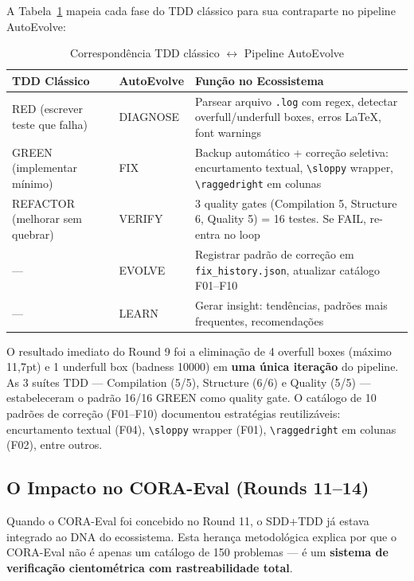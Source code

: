 A Tabela~\ref{tab:tdd_pipeline} mapeia cada fase do TDD clássico para sua
contraparte no pipeline AutoEvolve:

\begin{table}[H]\centering
\caption{Correspondência TDD clássico $\leftrightarrow$ Pipeline AutoEvolve}
\label{tab:tdd_pipeline}
\begin{tabular}{p{}p{}p{}}
\toprule
\textbf{TDD Clássico} & \textbf{AutoEvolve} & \textbf{Função no Ecossistema} \\
\midrule
RED (escrever teste que falha) & DIAGNOSE & Parsear arquivo \texttt{.log} com regex, detectar overfull/underfull boxes, erros LaTeX, font warnings \\
GREEN (implementar mínimo) & FIX & Backup automático + correção seletiva: encurtamento textual, \texttt{\textbackslash sloppy} wrapper, \texttt{\textbackslash raggedright} em colunas \\
REFACTOR (melhorar sem quebrar) & VERIFY & 3 quality gates (Compilation 5, Structure 6, Quality 5) = 16 testes. Se FAIL, re-entra no loop \\
— & EVOLVE & Registrar padrão de correção em \texttt{fix\_history.json}, atualizar catálogo F01--F10 \\
— & LEARN & Gerar insight: tendências, padrões mais frequentes, recomendações \\
\bottomrule
\end{tabular}
\end{table}

O resultado imediato do Round 9 foi a eliminação de 4 overfull boxes (máximo
11,7pt) e 1 underfull box (badness 10000) em \textbf{uma única iteração} do
pipeline. As 3 suítes TDD — Compilation (5/5), Structure (6/6) e Quality
(5/5) — estabeleceram o padrão 16/16 GREEN como quality gate. O catálogo de
10 padrões de correção (F01--F10) documentou estratégias reutilizáveis:
encurtamento textual (F04), \texttt{\textbackslash sloppy} wrapper (F01),
\texttt{\textbackslash raggedright} em colunas (F02), entre outros.

\subsection{O Impacto no CORA-Eval (Rounds 11--14)}

Quando o CORA-Eval foi concebido no Round 11, o SDD+TDD já estava integrado
ao DNA do ecossistema. Esta herança metodológica explica por que o CORA-Eval
não é apenas um catálogo de 150 problemas — é um \textbf{sistema de
verificação cientométrica com rastreabilidade total}.

